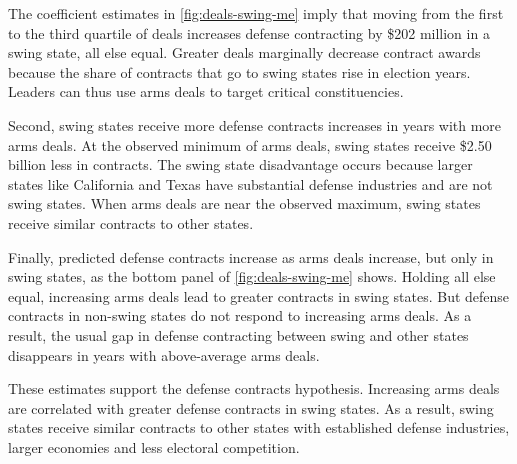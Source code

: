 \documentclass[12pt]{article}
\begin{document}
The coefficient estimates in \autoref{fig:deals-swing-me} imply that moving from the first to the third quartile of deals increases defense contracting by \$202 million in a swing state, all else equal. 
Greater deals marginally decrease contract awards because the share of contracts that go to swing states rise in election years. 
Leaders can thus use arms deals to target critical constituencies.


Second, swing states receive more defense contracts increases in years with more arms deals. 
At the observed minimum of arms deals, swing states receive \$2.50 billion less in contracts.
The swing state disadvantage occurs because larger states like California and Texas have substantial defense industries and are not swing states.
When arms deals are near the observed maximum, swing states receive similar contracts to other states. 


Finally, predicted defense contracts increase as arms deals increase, but only in swing states, as the bottom panel of \autoref{fig:deals-swing-me} shows. 
Holding all else equal, increasing arms deals lead to greater contracts in swing states. 
But defense contracts in non-swing states do not respond to increasing arms deals.
As a result, the usual gap in defense contracting between swing and other states disappears in years with above-average arms deals. 



These estimates support the defense contracts hypothesis. 
Increasing arms deals are correlated with greater defense contracts in swing states. 
As a result, swing states receive similar contracts to other states with established defense industries, larger economies and less electoral competition. 
%
%
%
%
\end{document}
